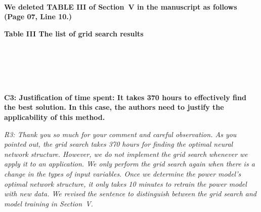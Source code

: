 \documentclass[onecolumn]{IEEEconf}
\begin{document}
\begin{description}
    ~\\
    \textbf{We deleted TABLE III of Section~V in the manuscript as follows (Page 07, Line 10.)}\\
    \begin{mdframed}[ linewidth=.75pt, userdefinedwidth=0.9\textwidth]
    \centering
    \textbf{Table III The list of grid search results}~\\
    ~\\
    ~\\
    \end{mdframed}
	~\\
	~\\
    \item \textbf
    {
	C3: Justification of time spent:
It takes 370 hours to effectively find the best solution. In this case, the authors need to justify the applicability of this method.
	}
	\item \textit
	{
	R3: Thank you so much for your comment and careful observation. As you pointed out, the grid search takes 370 hours for finding the optimal neural network structure.
    However, we do not implement the grid search whenever we apply it to an application. We only perform the grid search again when there is a change in the types of input variables.
    Once we determine the power model's optimal network structure, it only takes 10 minutes to retrain the power model with new data. 
    We revised the sentence to distinguish between the grid search and model training in Section~V.
	}
	~\\

\end{description}
\end{document}
